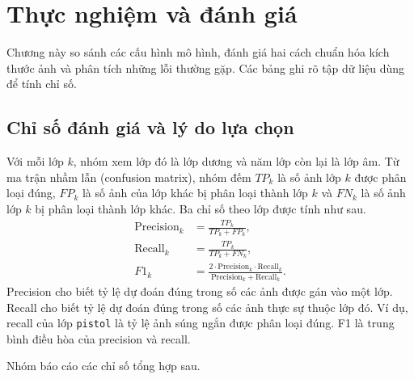 \section{Thực nghiệm và đánh giá}
\label{sec:thuc_nghiem}

Chương này so sánh các cấu hình mô hình, đánh giá hai cách chuẩn hóa kích thước ảnh và phân tích những lỗi thường gặp. Các bảng ghi rõ tập dữ liệu dùng để tính chỉ số.

\subsection{Chỉ số đánh giá và lý do lựa chọn}
\label{sec:metrics}

Với mỗi lớp $k$, nhóm xem lớp đó là lớp dương và năm lớp còn lại là lớp âm. Từ ma trận nhầm lẫn (confusion matrix), nhóm đếm $TP_k$ là số ảnh lớp $k$ được phân loại đúng, $FP_k$ là số ảnh của lớp khác bị phân loại thành lớp $k$ và $FN_k$ là số ảnh lớp $k$ bị phân loại thành lớp khác. Ba chỉ số theo lớp được tính như sau.
\begin{align}
  \text{Precision}_k &= \frac{TP_k}{TP_k + FP_k}, \\
  \text{Recall}_k &= \frac{TP_k}{TP_k + FN_k}, \\
  F1_k &= \frac{2 \cdot \text{Precision}_k \cdot \text{Recall}_k}{\text{Precision}_k + \text{Recall}_k} .
\end{align}
Precision cho biết tỷ lệ dự đoán đúng trong số các ảnh được gán vào một lớp. Recall cho biết tỷ lệ dự đoán đúng trong số các ảnh thực sự thuộc lớp đó. Ví dụ, recall của lớp \texttt{pistol} là tỷ lệ ảnh súng ngắn được phân loại đúng. F1 là trung bình điều hòa của precision và recall.

Nhóm báo cáo các chỉ số tổng hợp sau.

